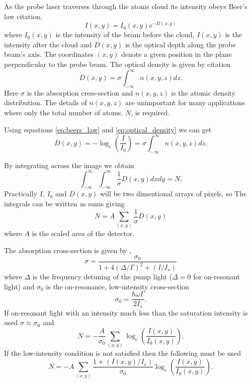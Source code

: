 As the probe laser traverses through the atoms cloud its intensity obeys Beer's law{\color{red} citation},
\begin{equation}\label{eq:beers_law}
I(x, y) = I_0(x, y)e^{-D(x, y)}
\end{equation}
where $I_0(x, y)$ is the intensity of the beam before the cloud, $I(x, y)$ is the intensity after the cloud and $D(x, y)$ is the optical depth along the probe beam's axis. The coordinates $(x, y)$ denote a given position in the plane perpendicular to the probe beam. The optical density is given by{\color{red} citation}
\begin{equation}\label{eq:optical_density}
D(x, y) = \sigma \int_{-\infty}^{\infty}n(x, y, z)dz.
\end{equation}
Here $\sigma$ is the absorption cress-section and $n(x, y, z)$ is the atomic density distribution. The details of $n(x, y, z)$ are unimportant for many applications where only the total number of atoms, $N$, is required.

Using equations \ref{eq:beers_law} and \ref{eq:optical_density} we can get
\begin{equation}
D(x, y) = -\log_e(\frac{I}{I_0}) = \sigma \int_{-\infty}^{\infty} n(x, y, z) dz.
\end{equation}

By integrating across the image we obtain
\begin{equation}
\int_{-\infty}^{\infty} \int_{-\infty}^{\infty} \frac{1}{\sigma}D(x, y) dx dy = N.
\end{equation}
Practically $I$, $I_0$ and $D(x, y)$ will be two dimentional arrays of pixels, so The integrals can be written as sums giving
\begin{equation}
N = A \sum_{(x, y)} \frac{1}{\sigma}D(x, y)
\end{equation}
where $A$ is the scaled area of the detector.

The absorption cross-section is given by \cite{steck_rubidium_2001},
\begin{equation}\label{eq:cross_section}
\sigma = \frac{\sigma_0}{1+4(\Delta/\Gamma)^2 + (I/I_s)}
\end{equation}
where $\Delta$ is the frequency detuning of the pump light ($\Delta=0$ for on-resonant light) and $\sigma_0$ is the on-resonance, low-intensity  cross-section
\begin{equation}
\sigma_0 = \frac{\hbar\omega\Gamma}{2I_s}.
\end{equation}
If on-resonant light with an intensity much less than the saturation intensity is used $\sigma \approx \sigma_0$ and
\begin{equation}
N = -\frac{A}{\sigma_0} \sum_{(x, y)} \log_e\left(\frac{I(x, y)}{I_0(x, y)}\right).
\end{equation}
If the low-intensity condition is not satisfied then the following must be used
\begin{equation}
N = -A \sum_{(x, y)} \frac{1+(I(x, y)/I_s)}{\sigma_0} \log_e\left(\frac{I(x, y)}{I_0(x, y)}\right).
\end{equation}

